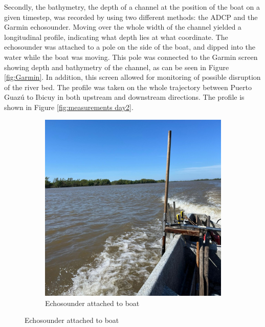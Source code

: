 Secondly, the bathymetry, the depth of a channel at the position of the boat on a given timestep, was recorded by using two different methods: the ADCP and the Garmin echosounder. Moving over the whole width of the channel yielded a longitudinal profile, indicating what depth lies at what coordinate.
The echosounder was attached to a pole on the side of the boat, and dipped into the water while the boat was moving. This pole was connected to the Garmin screen showing depth and bathymetry of the channel, as can be seen in Figure \ref{fig:Garmin}. In addition, this screen allowed for monitoring of possible disruption of the river bed. The profile was taken on the whole trajectory between Puerto Guazú to Ibicuy in both upstream and downstream directions. The profile is shown in Figure \ref{fig:measurements day2}.

\begin{figure}[H]
    \centering
    \begin{subfigure}[b]{0.48\textwidth}
        \includegraphics[width=\linewidth]{figures/ch4/Echosounder.jpg}
        \caption{Echosounder attached to boat}
        

\end{subfigure}
\end{figure}
